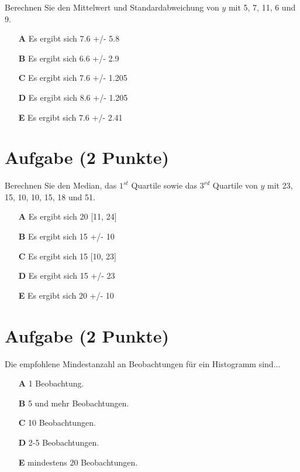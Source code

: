\documentclass[a4paper, 9pt]{scrartcl}\usepackage[]{graphicx}\usepackage[]{xcolor}
\begin{document}
Berechnen Sie den Mittelwert und Standardabweichung von $y$ mit 5, 7, 11, 6 und 9.



\begin{enumerate}
\item [\textbf{A} \msquare] Es ergibt sich 7.6 +/- 5.8
\item [\textbf{B} \msquare] Es ergibt sich 6.6 +/- 2.9
\item [\textbf{C} \msquare] Es ergibt sich 7.6 +/- 1.205
\item [\textbf{D} \msquare] Es ergibt sich 8.6 +/- 1.205
\item [\textbf{E} \msquare] Es ergibt sich 7.6 +/- 2.41
\end{enumerate} 

\section{Aufgabe \hfill (2 Punkte)}




Berechnen Sie den Median, das $1^{st}$ Quartile sowie das $3^{rd}$ Quartile von $y$ mit 23, 15, 10, 10, 15, 18 und 51.



\begin{enumerate}
\item [\textbf{A} \msquare] Es ergibt sich 20 [11, 24]
\item [\textbf{B} \msquare] Es ergibt sich 15 +/- 10
\item [\textbf{C} \msquare] Es ergibt sich 15 [10, 23]
\item [\textbf{D} \msquare] Es ergibt sich 15 +/- 23
\item [\textbf{E} \msquare] Es ergibt sich 20 +/- 10
\end{enumerate} 

\section{Aufgabe \hfill (2 Punkte)}



Die empfohlene Mindestanzahl an Beobachtungen f{\"u}r ein Histogramm sind...



\begin{enumerate}
\item [\textbf{A} \msquare] 1 Beobachtung.
\item [\textbf{B} \msquare] 5 und mehr Beobachtungen.
\item [\textbf{C} \msquare] 10 Beobachtungen.
\item [\textbf{D} \msquare] 2-5 Beobachtungen.
\item [\textbf{E} \msquare] mindestens 20 Beobachtungen.
\end{enumerate} 
\end{document}
